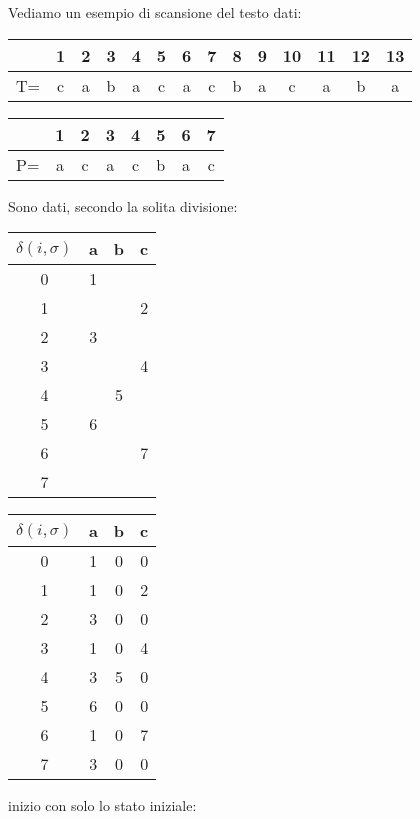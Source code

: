 \begin{esempio}
  Vediamo un esempio di scansione del testo dati:
  \begin{table}[H]
    \centering
    \begin{tabular}{c||c|c|c|c|c|c|c|c|c|c|c|c|c}
      \hline
      & 1 & 2 & 3 & 4 & 5 & 6 & 7 & 8 & 9 & 10 & 11 & 12 & 13 \\
      \hline
      T=&c& a & b& a& c& a &c &b &a &c&a&b&a\\
      \hline
    \end{tabular}
  \end{table}
  \begin{table}[H]
    \centering
    \begin{tabular}{c||c|c|c|c|c|c|c}
      \hline
      & 1 & 2 & 3 & 4 & 5 & 6 & 7 \\
      \hline
      P=&a& c & a& c& b& a &c \\
      \hline
    \end{tabular}
  \end{table}
  Sono dati, secondo la solita divisione:
  \begin{table}[H]
    \centering
    \begin{tabular}{c||c|c|c}
      $\delta(i,\sigma)$ & a & b & c\\
      \hline
      0 & 1 &  & \\
      1 &  &  & 2\\
      2 & 3 &  & \\
      3 &  &  & 4\\
      4 &  & 5 & \\
      5 & 6 &  & \\
      6 &  &  & 7\\
      7 &  &  & 
    \end{tabular}
  \end{table}
  \begin{table}[H]
    \centering
    \begin{tabular}{c||c|c|c}
      $\delta(i,\sigma)$ & a & b & c\\
      \hline
      0 & 1 & 0 & 0\\
      1 & 1 & 0 & 2\\
      2 & 3 & 0 & 0\\
      3 & 1 & 0 & 4\\
      4 & 3 & 5 & 0\\
      5 & 6 & 0 & 0\\
      6 & 1 & 0 & 7\\
      7 & 3 & 0 & 0
    \end{tabular}
  \end{table}
  inizio con solo lo stato iniziale:
  \begin{center}
\end{center}
\end{esempio}
